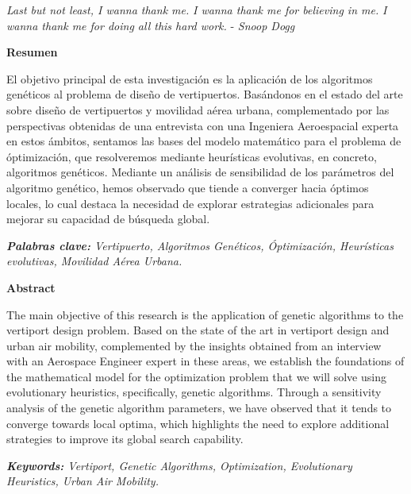 \documentclass[12pt,a4paper]{book}
\begin{document}
  \textsl{Last but not least, I wanna thank me.}  
  \textsl{I wanna thank me for believing in me.}
  \textsl{I wanna thank me for doing all this hard work.} -
\textsl{Snoop Dogg}



 

\thispagestyle{empty}
\clearpage
\setcounter{page}{1}


\newpage
\begin{center}
   {\bf Resumen} 
\end{center}
El objetivo principal de esta investigación es la aplicación de los algoritmos genéticos al problema de diseño de vertipuertos. Basándonos en el estado del arte sobre diseño de vertipuertos y movilidad aérea urbana, complementado por las perspectivas obtenidas de una entrevista con una Ingeniera Aeroespacial experta en estos ámbitos, sentamos las bases del modelo matemático para el problema de óptimización, que resolveremos mediante heurísticas evolutivas, en concreto, algoritmos genéticos. Mediante un análisis de sensibilidad de los parámetros del algoritmo genético, hemos observado que tiende a converger hacia óptimos locales, lo cual destaca la necesidad de explorar estrategias adicionales para mejorar su capacidad de búsqueda global.    

\vspace{0.6 cm}
\textsl{\textbf{Palabras clave:} Vertipuerto, Algoritmos Genéticos, Óptimización, Heurísticas evolutivas, Movilidad Aérea Urbana.} 



\begin{center}
   {\bf Abstract} 
\end{center}

The main objective of this research is the application of genetic algorithms to the vertiport design problem. Based on the state of the art in vertiport design and urban air mobility, complemented by the insights obtained from an interview with an Aerospace Engineer expert in these areas, we establish the foundations of the mathematical model for the optimization problem that we will solve using evolutionary heuristics, specifically, genetic algorithms. Through a sensitivity analysis of the genetic algorithm parameters, we have observed that it tends to converge towards local optima, which highlights the need to explore additional strategies to improve its global search capability.


\vspace{0.6 cm}
\textsl{\textbf{Keywords:} Vertiport, Genetic Algorithms, Optimization, Evolutionary Heuristics, Urban Air Mobility.} 
\end{document}
